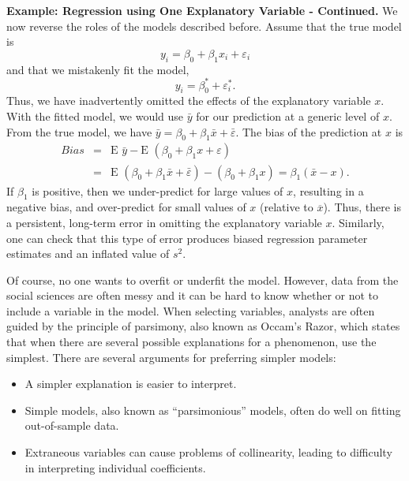 \textbf{Example: Regression using One Explanatory Variable -
Continued.} We now reverse the roles of the models described before.
Assume that the true model is
\begin{equation*}
y_i=\beta_0 +\beta_1 x_i+ \varepsilon_i
\end{equation*}
and that we mistakenly fit the model,
\begin{equation*}
y_i=\beta_0 ^{\ast}+ \varepsilon_i^{\ast}.
\end{equation*}
Thus, we have inadvertently omitted the effects of the explanatory
variable $x$. With the fitted model, we would use $\bar{y}$ for our
prediction at a generic level of $x$. From the true model, we have
$\bar{y}=\beta_0 +\beta_1 \bar{x}+\bar{\varepsilon}$. The bias of
the prediction at $x$ is
\begin{eqnarray*}
Bias &=&\text{E }\bar{y}-\text{E }(\beta_0 +\beta_1 x+ \varepsilon) \\
&=&\text{E }(\beta_0 +\beta_1 \bar{x}+\bar{\varepsilon})-(\beta_0
+\beta_1 x)=\beta_1 (\bar{x}-x).
\end{eqnarray*}
If $\beta_1$ is positive, then we under-predict for large values of
$x$, resulting in a negative bias, and over-predict for small values
of $x$ (relative to $\overline{x}$). Thus, there is a persistent,
long-term error in omitting the explanatory variable $x$. Similarly,
one can check that this type of error produces biased regression
parameter estimates and an inflated value of $s^{2}$.

\linejed

\bigskip

Of course, no one wants to overfit or underfit the model. However,
data from the social sciences are often messy and it can be hard to
know whether or not to include a variable in the model. When
selecting variables, analysts are often guided by the principle of
parsimony, also known as Occam's Razor, which states that when there
are several possible explanations for a phenomenon, use the
simplest. There are several arguments for preferring simpler models:


    \begin{itemize}
   \item A simpler explanation is easier to
   interpret.
   \item Simple models, also known as ``parsimonious'' models,
   often do well on fitting out-of-sample data.
   \item Extraneous variables can cause problems of collinearity,
   leading to difficulty in interpreting individual coefficients.
 \end{itemize}


